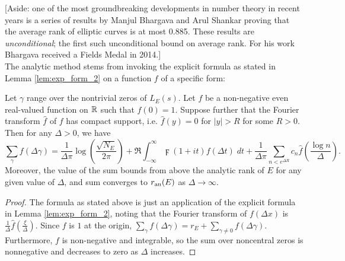[Aside: one of the most groundbreaking developments in number theory in recent years is a series of results by Manjul Bhargava and Arul Shankar \cite{BhSh-2010a} \cite{BhSh-2010b} \cite{BhSh-2013} proving that the average rank of elliptic curves is at most 0.885. These results are {\it unconditional}; the first such unconditional bound on average rank. For his work Bhargava received a Fields Medal in 2014.] \\

The analytic method stems from invoking the explicit formula as stated in Lemma \ref{lem:exp_form_2} on a function $f$ of a specific form:
\begin{lemma}[GRH]\label{lem:exp_form_nonneg_f_cpt_suppt}
Let $\gamma$ range over the nontrivial zeros of $L_E(s)$. Let $f$ be a non-negative even real-valued function on $\mathbb{R}$ such that $f(0)=1$. Suppose further that the Fourier transform $\hat{f}$ of $f$ has compact support, i.e. $\hat{f}(y) = 0$ for $|y|>R$ for some $R>0$. Then for any $\Delta>0$, we have
\begin{equation}
\sum_{\gamma} f(\Delta \gamma) = \frac{1}{\Delta \pi}\log\left(\frac{\sqrt{N_E}}{2\pi}\right) + \Re\int_{-\infty}^{\infty} \digamma(1+it)f(\Delta t) \; dt  + \frac{1}{\Delta \pi}\sum_{n<e^{\Delta R}} c_n \hat{f}\left(\frac{\log n}{\Delta}\right).
\end{equation}
Moreover, the value of the sum bounds from above the analytic rank of $E$ for any given value of $\Delta$, and sum converges to $r_{{\rm an}}(E)$ as $\Delta \to \infty$.
\end{lemma}

\begin{proof}
The formula as stated above is just an application of the explicit formula in Lemma \ref{lem:exp_form_2}, noting that the Fourier transform of $f(\Delta x)$ is $\frac{1}{\Delta}\hat{f}\left(\frac{\xi}{\Delta}\right)$. Since $f$ is $1$ at the origin, $\sum_{\gamma} f(\Delta \gamma) = r_E + \sum_{\gamma\ne 0} f(\Delta \gamma)$. Furthermore, $f$ is non-negative and integrable, so the sum over noncentral zeros is nonnegative and decreases to zero as $\Delta$ increases.
\end{proof}

